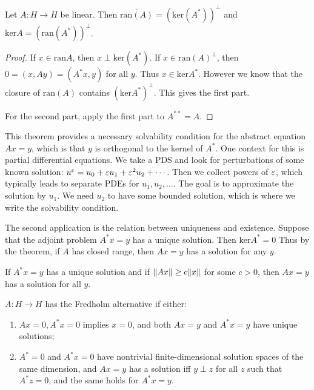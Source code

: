 \documentclass[10pt, twoside]{article}
\begin{document}
    \begin{thm}
        Let $A: H \to H$ be linear. Then $\overline{\mathrm{ran}(A)} = (\mathrm{ker}(A^*))^{\perp}$ and $\mathrm{ker} A = (\mathrm{ran}(A^*))^{\perp}$.

        \begin{proof}
            If $x \in \mathrm{ran} A$, then $x \perp \mathrm{ker}(A^*)$. If $x \in \mathrm{ran}(A)^{\perp}$, then $0 = (x,Ay) = (A^*x,y)$ for all $y$. Thus $x \in \mathrm{ker}A^*$. However we know that the closure of $\mathrm{ran}(A)$ contains $(\mathrm{ker} A^*)^{\perp}$. This gives the first part.

            For the second part, apply the first part to $A^{ ** } = A$.
        \end{proof}
    \end{thm}

    This theorem provides a necessary solvability condition for the abstract equation $Ax = y$, which is that $y$ is orthogonal to the kernel of $A^*$. One context for this is partial differential equations. We take a PDS and look for perturbations of some known solution: $u^{\varepsilon} = u_0 + \varepsilon u_1 + \varepsilon^2 u_2 + \cdots$. Then we collect powers of $\varepsilon$, which typically leads to separate PDEs for $u_1, u_2, \ldots$. The goal is to approximate the solution by $u_1$. We need $u_2$ to have some bounded solution, which is where we write the solvability condition.

    The second application is the relation between uniqueness and existence. Suppose that the adjoint problem $A^*x = y$ has a unique solution. Then $\mathrm{ker}A^* = 0$ Thus by the theorem, if $A$ has closed range, then $Ax=y$ has a solution for any $y$.

    \begin{lem}
        If $A^*x = y$ has a unique solution and if $\lVert Ax\rVert \geq c \lVert x\rVert$ for some $c>0$, then $Ax=y$ has a solution for all $y$.
    \end{lem}

    \begin{defn}
        $A:H \to H$ has the Fredholm alternative if either:
        \begin{enumerate}
            \item $Ax=0,A^*x=0$ implies $x=0$, and both $Ax=y$ and $A^*x = y$ have unique solutions;
            \item $A^*=0$ and $A^*x=0$ have nontrivial finite-dimensional solution spaces of the same dimension, and $Ax=y$ has a solution iff $y \perp z$ for all $z$ such that $A^*z = 0$, and the same holds for $A^*x=y$.
        \end{enumerate}
    \end{defn}
\end{document}
